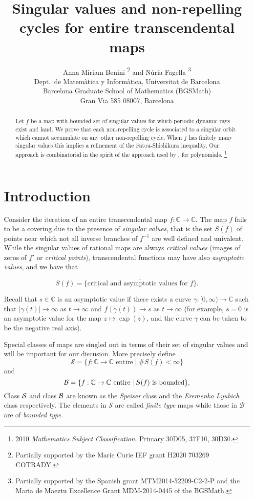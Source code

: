 \documentclass[11pt, twoside]{article}
\title{Singular values and non-repelling cycles for entire transcendental maps}
\author{Anna Miriam Benini \thanks{Partially supported by   the Marie Curie IEF grant H2020 703269 COTRADY.} {\small and}  N\'uria Fagella \thanks{Partially supported by the Spanish 
grant MTM2014-52209-C2-2-P and the Maria de Maeztu Excellence Grant MDM-2014-0445 of the BGSMath.} \\
\small Dept.~de Matem\`atica y Inform\`atica, Universitat de Barcelona\\ \small Barcelona Graduate School of Mathematics (BGSMath) \\ %
\small Gran Via 585 08007, Barcelona}
\theoremstyle{definition}
\newcommand{\C}{\mathbb{C}}
\newcommand{\ra}{\rightarrow}
\newcommand{\BB}{{\cal B}}
\renewcommand{\SS}{{\cal S}}
\begin{document}
 


\maketitle  
\begin{abstract}Let $f$ be a map with bounded set of singular values for which periodic dynamic rays exist and land. We prove that each non-repelling cycle is associated to a singular orbit  which cannot accumulate on any other non-repelling cycle. When $f$ has finitely many singular values this implies a refinement  of the Fatou-Shishikura inequality. Our approach is combinatorial in the spirit of the approach used by   \cite{Ki00}, \cite{BCLOS16} for polynomials. \let\thefootnote\relax\footnote{2010 {\em Mathematics Subject Classification}. Primary 30D05, 37F10, 30D30.}

\end{abstract}


\section{Introduction} 

 

Consider the iteration of an entire transcendental  map $f:\C\ra\C$. The map $f$ fails to be a covering due to the presence of \emph{singular values}, that is the set $S(f)$ of points near which not all inverse branches of $f^{-1}$ are well defined and univalent.  While the singular values of rational maps are always {\em critical values} (images of zeros of $f'$ or {\em critical points}), transcendental functions may have also {\em asymptotic values}, and we have that 

\[S(f)=\overline{\{\text{critical and asymptotic values for $f$}\}}.\]

 Recall that $s\in \C$ is an asymptotic value if there exists a curve $\gamma:[0,\infty)\ra\C$ such that $|\gamma(t)|\ra\infty$ as $t\ra\infty$ and $f(\gamma(t))\ra s$ as $t\ra\infty$ (for example, $s=0$ is an asymptotic value for the map $z\mapsto \exp(z)$, and the curve $\gamma$ can be taken to be the negative real axis).

Special classes of maps are singled out in terms of their set of singular values and will be important for our discusion. More precisely define 
\[
\mathcal{S} = \{ f:\C\to\C \text{\ entire} \mid \#S(f)<\infty\} 
\]
and
\[
\BB = \{ f:\C\to\C \text{\ entire} \mid S(f) \text{\ is bounded} \}, 
\]
Class $\SS$ and class $\BB$
 are known as the {\em Speiser} class and the {\em Eremenko Lyubich} class respectively. The elements in  $\mathcal{S}$ are called  {\em finite type} maps while those in $\mathcal{B}$  are  of {\em bounded type}. 
\end{document}
